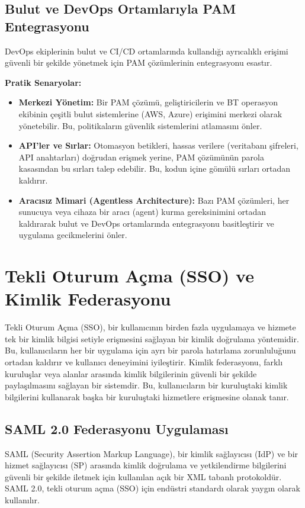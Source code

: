 \subsection{Bulut ve DevOps Ortamlarıyla PAM Entegrasyonu}

DevOps ekiplerinin bulut ve CI/CD ortamlarında kullandığı ayrıcalıklı erişimi güvenli bir şekilde yönetmek için PAM çözümlerinin entegrasyonu esastır.

\textbf{Pratik Senaryolar:}
\begin{itemize}
    \item \textbf{Merkezi Yönetim:} Bir PAM çözümü, geliştiricilerin ve BT operasyon ekibinin çeşitli bulut sistemlerine (AWS, Azure) erişimini merkezi olarak yönetebilir. Bu, politikaların güvenlik sistemlerini atlamasını önler.
    \item \textbf{API'ler ve Sırlar:} Otomasyon betikleri, hassas verilere (veritabanı şifreleri, API anahtarları) doğrudan erişmek yerine, PAM çözümünün parola kasasından bu sırları talep edebilir. Bu, kodun içine gömülü sırları ortadan kaldırır.
    \item \textbf{Aracısız Mimari (Agentless Architecture):} Bazı PAM çözümleri, her sunucuya veya cihaza bir aracı (agent) kurma gereksinimini ortadan kaldırarak bulut ve DevOps ortamlarında entegrasyonu basitleştirir ve uygulama gecikmelerini önler.
\end{itemize}

\section{Tekli Oturum Açma (SSO) ve Kimlik Federasyonu}
Tekli Oturum Açma (SSO), bir kullanıcının birden fazla uygulamaya ve hizmete tek bir kimlik bilgisi setiyle erişmesini sağlayan bir kimlik doğrulama yöntemidir. Bu, kullanıcıların her bir uygulama için ayrı bir parola hatırlama zorunluluğunu ortadan kaldırır ve kullanıcı deneyimini iyileştirir. Kimlik federasyonu, farklı kuruluşlar veya alanlar arasında kimlik bilgilerinin güvenli bir şekilde paylaşılmasını sağlayan bir sistemdir. Bu, kullanıcıların bir kuruluştaki kimlik bilgilerini kullanarak başka bir kuruluştaki hizmetlere erişmesine olanak tanır.

\subsection{SAML 2.0 Federasyonu Uygulaması}

SAML (Security Assertion Markup Language), bir kimlik sağlayıcısı (IdP) ve bir hizmet sağlayıcısı (SP) arasında kimlik doğrulama ve yetkilendirme bilgilerini güvenli bir şekilde iletmek için kullanılan açık bir XML tabanlı protokoldür. SAML 2.0, tekli oturum açma (SSO) için endüstri standardı olarak yaygın olarak kullanılır.

